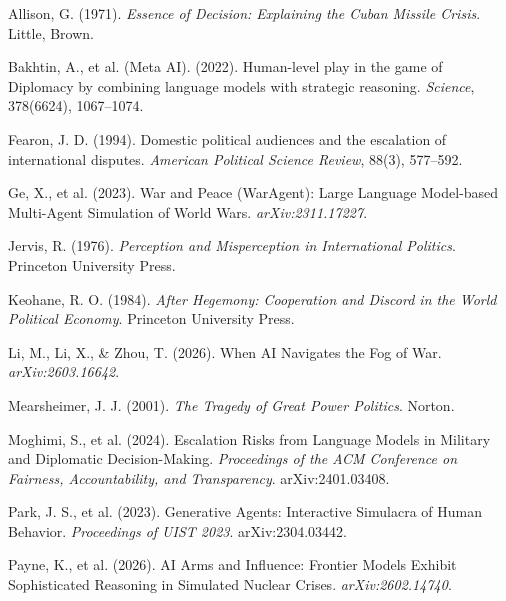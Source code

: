 \documentclass[12pt, a4paper]{article}
\begin{document}
\begin{enumerate}[leftmargin=1.5em, label={[\arabic*]}]
    \item Allison, G. (1971). \textit{Essence of Decision: Explaining the Cuban Missile Crisis}. Little, Brown.

    \item Bakhtin, A., et al. (Meta AI). (2022). Human-level play in the game of Diplomacy by combining language models with strategic reasoning. \textit{Science}, 378(6624), 1067--1074.

    \item Fearon, J. D. (1994). Domestic political audiences and the escalation of international disputes. \textit{American Political Science Review}, 88(3), 577--592.

    \item Ge, X., et al. (2023). War and Peace (WarAgent): Large Language Model-based Multi-Agent Simulation of World Wars. \textit{arXiv:2311.17227}.

    \item Jervis, R. (1976). \textit{Perception and Misperception in International Politics}. Princeton University Press.

    \item Keohane, R. O. (1984). \textit{After Hegemony: Cooperation and Discord in the World Political Economy}. Princeton University Press.

    \item Li, M., Li, X., \& Zhou, T. (2026). When AI Navigates the Fog of War. \textit{arXiv:2603.16642}.

    \item Mearsheimer, J. J. (2001). \textit{The Tragedy of Great Power Politics}. Norton.

    \item Moghimi, S., et al. (2024). Escalation Risks from Language Models in Military and Diplomatic Decision-Making. \textit{Proceedings of the ACM Conference on Fairness, Accountability, and Transparency}. arXiv:2401.03408.

    \item Park, J. S., et al. (2023). Generative Agents: Interactive Simulacra of Human Behavior. \textit{Proceedings of UIST 2023}. arXiv:2304.03442.

    \item Payne, K., et al. (2026). AI Arms and Influence: Frontier Models Exhibit Sophisticated Reasoning in Simulated Nuclear Crises. \textit{arXiv:2602.14740}.


\end{enumerate}
\end{document}
